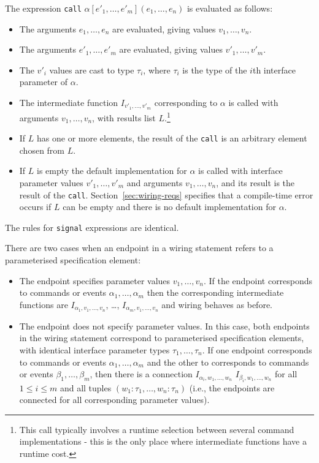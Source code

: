 \documentclass[11pt]{article}
\newcommand{\code}[1]{{\tt #1}}
\begin{document}
The expression \code{call} $\alpha[e'_1, \ldots, e'_m](e_1, \ldots, e_n)$
is evaluated as follows:
\begin{itemize}
\item The arguments $e_1, \ldots, e_n$ are evaluated, giving values $v_1,
\ldots, v_n$.
\item The arguments $e'_1, \ldots, e'_m$ are evaluated, giving values $v'_1,
\ldots, v'_m$.
\item The $v'_i$ values are cast to type $\tau_i$, where $\tau_i$ is the
type of the $i$th interface parameter of $\alpha$.
\item The intermediate function $I_{v'_1,\ldots,v'_m}$ corresponding to
$\alpha$ is called with arguments $v_1, \ldots, v_n$, with results list
$L$.\footnote{This call typically involves a runtime selection between
several command implementations - this is the only place where intermediate
functions have a runtime cost.}
\item If $L$ has one or more elements, the result of the \code{call} is an
arbitrary element chosen from $L$.
\item If $L$ is empty the default implementation for $\alpha$ is called
with interface parameter values $v'_1, \ldots, v'_m$ and arguments $v_1,
\ldots, v_n$, and its result is the result of the
\code{call}. Section~\ref{sec:wiring-reqs} specifies that a compile-time
error occurs if $L$ can be empty and there is no default implementation for
$\alpha$.
\end{itemize}
The rules for \code{signal} expressions are identical.

There are two cases when an endpoint in a wiring statement refers to a
parameterised specification element:
\begin{itemize}
\item The endpoint specifies parameter values $v_1, \ldots, v_n$. If the
endpoint corresponds to commands or events $\alpha_1, \ldots, \alpha_m$
then the corresponding intermediate functions are
$I_{\alpha_1,v_1,\ldots,v_n}$, \ldots, $I_{\alpha_m,v_1,\ldots,v_n}$ and
wiring behaves as before.
\item The endpoint does not specify parameter values. In this case, both
endpoints in the wiring statement correspond to parameterised specification
elements, with identical interface parameter types $\tau_1, \ldots,
\tau_n$. If one endpoint corresponds to commands or events $\alpha_1,
\ldots, \alpha_m$ and the other to corresponds to commands or events
$\beta_1, \ldots, \beta_m$, then there is a connection $I_{\alpha_i, w_1,
\ldots, w_n}$ \code{<->} $I_{\beta_i, w_1,\ldots, w_n}$ for all $1 \leq i
\leq m$ and all tuples $(w_1:\tau_1, \ldots, w_n:\tau_n)$ (i.e., the
endpoints are connected for all corresponding parameter values).
\end{itemize}
\end{document}

